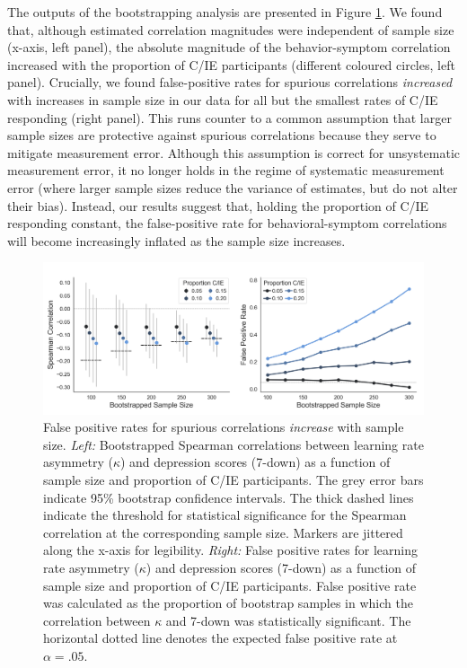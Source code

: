 \documentclass[a4paper,notitlepage,12pt]{article}
\begin{document}
\begin{refsection}[main]
The outputs of the bootstrapping analysis are presented in Figure \ref{fig:bootstrap}. We found that, although estimated correlation magnitudes were independent of sample size (x-axis, left panel), the absolute magnitude of the behavior-symptom correlation increased with the proportion of C/IE participants (different coloured circles, left panel). Crucially, we found false-positive rates for spurious correlations \emph{increased} with increases in sample size in our data for all but the smallest rates of C/IE responding (right panel). This runs counter to a common assumption that larger sample sizes are protective against spurious correlations because they serve to mitigate measurement error. Although this assumption is correct for unsystematic measurement error, it no longer holds in the regime of systematic measurement error (where larger sample sizes reduce the variance of estimates, but do not alter their bias). Instead, our results suggest that, holding the proportion of C/IE responding constant, the false-positive rate for behavioral-symptom correlations will become increasingly inflated as the sample size increases.

\begin{figure}[!t]
\includegraphics[width=16cm]{../figures/main_03b.png}
\centering
\captionsetup{width=0.88\textwidth}
\caption{False positive rates for spurious correlations \emph{increase} with sample size. \textit{Left:} Bootstrapped Spearman correlations between learning rate asymmetry ($\kappa$) and depression scores (7-down) as a function of sample size and proportion of C/IE participants. The grey error bars indicate 95\% bootstrap confidence intervals. The thick dashed lines indicate the threshold for statistical significance for the Spearman correlation at the corresponding sample size. Markers are jittered along the x-axis for legibility. \textit{Right:} False positive rates for learning rate asymmetry ($\kappa$) and depression scores (7-down) as a function of sample size and proportion of C/IE participants. False positive rate was calculated as the proportion of bootstrap samples in which the correlation between $\kappa$ and 7-down was statistically significant. The horizontal dotted line denotes the expected false positive rate at $\alpha = .05$.}
\label{fig:bootstrap}
\end{figure}


\end{refsection}
\end{document}
